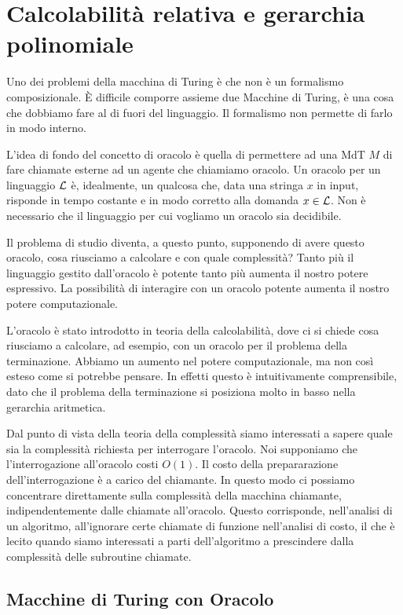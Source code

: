 \chapter{Calcolabilità relativa e gerarchia polinomiale}

Uno dei problemi della macchina di Turing è che non è un formalismo composizionale. È difficile
comporre assieme due Macchine di Turing, è una cosa che dobbiamo fare al di fuori del linguaggio.
Il formalismo non permette di farlo in modo interno.

L'idea di fondo del concetto di oracolo è quella di permettere ad una MdT $M$ di fare chiamate
esterne ad un agente che chiamiamo oracolo. Un oracolo per un linguaggio $\mathcal{L}$ è, idealmente, un
qualcosa che, data una stringa $x$ in input, risponde in tempo costante e in modo corretto alla
domanda $x \in \mathcal{L}$. Non è necessario che il linguaggio per cui vogliamo un oracolo sia
decidibile.

Il problema di studio diventa, a questo punto, supponendo di avere questo oracolo, cosa riusciamo a
calcolare e con quale complessità? Tanto più il linguaggio gestito dall'oracolo è potente tanto
più aumenta il nostro potere espressivo. La possibilità di interagire con un oracolo potente
aumenta il nostro potere computazionale.

L'oracolo è stato introdotto in teoria della calcolabilità, dove ci si chiede cosa riusciamo a
calcolare, ad esempio, con un oracolo per il problema della terminazione. Abbiamo un aumento nel
potere computazionale, ma non così esteso come si potrebbe pensare. In effetti questo è
intuitivamente comprensibile, dato che il problema della terminazione si posiziona molto in basso
nella gerarchia aritmetica.

Dal punto di vista della teoria della complessità siamo interessati a sapere quale sia la
complessità richiesta per interrogare l'oracolo. Noi supponiamo che l'interrogazione all'oracolo
costi $O(1)$. Il costo della prepararazione dell'interrogazione è a carico del chiamante. In questo
modo ci possiamo concentrare direttamente sulla complessità della macchina chiamante,
indipendentemente dalle chiamate all'oracolo. Questo corrisponde, nell'analisi di un algoritmo,
all'ignorare certe chiamate di funzione nell'analisi di costo, il che è lecito quando siamo
interessati a parti dell'algoritmo a prescindere dalla complessità delle subroutine chiamate.

\section{Macchine di Turing con Oracolo}

